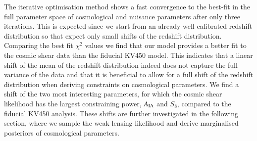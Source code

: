 \documentclass{aa}
\begin{document}
The iterative optimisation method shows a fast convergence to the best-fit in the full parameter space of cosmological and nuisance parameters after only three iterations. This is expected since we start from an already well calibrated redshift distribution so that expect only small shifts of the redshift distribution. Comparing the best fit $\chi^2$ values we find that our model provides a better fit to the cosmic shear data than the fiducial KV450 model. This indicates that a linear shift of the mean of the redshift distribution indeed does not capture the full variance of the data and that it is beneficial to allow for a full shift of the redshift distribution when deriving constraints on cosmological parameters. We find a shift of the two most interesting parameters, for which the cosmic shear likelihood has the largest constraining power, $A_{\rm IA}$ and $S_8$, compared to the fiducial KV450 analysis. These shifts are further investigated in the following section, where we sample the weak lensing likelihood and derive marginalised posteriors of cosmological parameters. 
\end{document}

